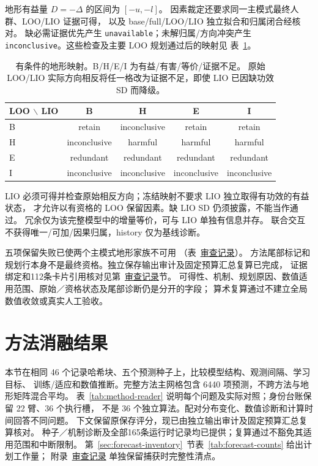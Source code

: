 地形有益量 \(D=-\Delta\) 的区间为 \([-u,-l]\)。
因素裁定还要求同一主模式最终人群、LOO/LIO 证据可得，
以及 base/full/LOO/LIO 独立拟合和归属闭合经核对。
缺必需证据优先产生 \texttt{unavailable}；未解归属/方向冲突产生
\texttt{inconclusive}。这些检查及主要 LOO 规划通过后的映射见
表~\ref{tab:loo-lio-states}。

\begin{table}[htbp]
\centering\small
\caption{有条件的地形映射。B/H/E/I 为有益/有害/等价/证据不足。
原始 LOO/LIO 实际方向相反将任一格改为证据不足，即使 LIO 已因缺功效 SD 而降级。}
\label{tab:loo-lio-states}\hypertarget{tab:loo-lio-states}{}
\begin{tabular}{lcccc}
\toprule
LOO \(\backslash\) LIO & B & H & E & I\\
\midrule
B & retain & inconclusive & retain & retain\\
H & inconclusive & harmful & harmful & harmful\\
E & redundant & redundant & redundant & redundant\\
I & inconclusive & inconclusive & inconclusive & inconclusive\\
\bottomrule
\end{tabular}
\end{table}

LIO 必须可得并检查原始相反方向；冻结映射不要求 LIO 独立取得有功效的有益状态，
才允许以有资格的 LOO 保留因素。缺 LIO SD 仍须披露，不能当作通过。
冗余仅为该完整模型中的增量等价，可与 LIO 单独有信息并存。
联合交互不获得唯一/可加/因果归属，history 仅为基线诊断。

五项保留失败已使两个主模式地形家族不可用
（表~\href{audit-notes.pdf\#tab:failure-family-dispositions}{审查记录}）。
方法尾部标记和规划行本身不是最终资格。独立保存输出审计及固定预算汇总复算已完成，
证据绑定和112条卡片引用核对见第~\href{audit-notes.pdf\#sec:audited-review-update}{审查记录}节。
可得性、机制、规划原因、数值适用范围、原始／资格状态及尾部诊断仍是分开的字段；
算术复算通过不建立全局数值收敛或真实人工验收。


\section{方法消融结果}
\label{sec:method-results}\hypertarget{sec:method-results}{}
本节在相同 46 个记录哈希块、五个预测种子上，比较模型结构、观测间隔、学习目标、
训练/适应和数值推断。完整方法主网格包含 6440 项预测，不跨方法与地形矩阵混合平均。
表~\ref{tab:method-reader} 说明每个问题及实际对照；身份台账保留 22 臂、36 个执行槽，
不是 36 个独立算法。配对分布变化、数值诊断和计算时间回答不同问题。
下文保留原保存评分，现已由独立输出审计及固定预算汇总复算核对。
种子／机制诊断及全部165条运行时记录均已提供；复算通过不豁免其适用范围和中断限制。
第~\ref{sec:forecast-inventory}~节表~\ref{tab:forecast-counts} 给出计划工作量；
附录~\href{audit-notes.pdf\#sec:execution-coverage}{审查记录} 单独保留捕获时完整性清点。


